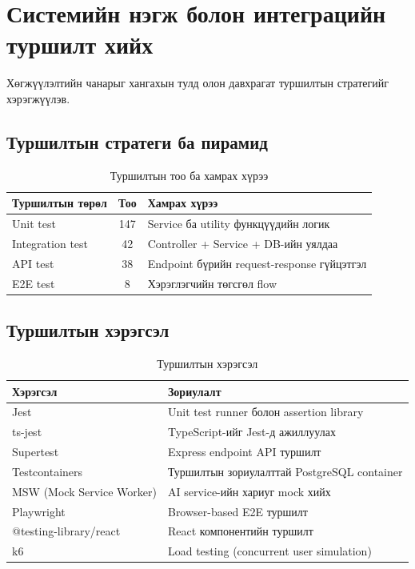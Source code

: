 \section{Системийн нэгж болон интеграцийн туршилт хийх}

Хөгжүүлэлтийн чанарыг хангахын тулд олон давхрагат туршилтын стратегийг хэрэгжүүлэв.

\subsection{Туршилтын стратеги ба пирамид}

\begin{table}[H]
\centering
\label{tab:test_pyramid}
\begin{tabular}{|l|c|p{5.5cm}|}
\hline
\textbf{Туршилтын төрөл} & \textbf{Тоо} & \textbf{Хамрах хүрээ} \\
\hline
Unit test & 147 & Service ба utility функцүүдийн логик \\
\hline
Integration test & 42 & Controller + Service + DB-ийн уялдаа \\
\hline
API test & 38 & Endpoint бүрийн request-response гүйцэтгэл \\
\hline
E2E test & 8 & Хэрэглэгчийн төгсгөл flow \\
\hline
\end{tabular}
\caption{Туршилтын тоо ба хамрах хүрээ}
\end{table}

\subsection{Туршилтын хэрэгсэл}

\begin{table}[H]
\centering
\label{tab:test_tools}
\begin{tabular}{|l|p{8.5cm}|}
\hline
\textbf{Хэрэгсэл} & \textbf{Зориулалт} \\
\hline
Jest & Unit test runner болон assertion library \\
\hline
ts-jest & TypeScript-ийг Jest-д ажиллуулах \\
\hline
Supertest & Express endpoint API туршилт \\
\hline
Testcontainers & Туршилтын зориулалттай PostgreSQL container \\
\hline
MSW (Mock Service Worker) & AI service-ийн хариуг mock хийх \\
\hline
Playwright & Browser-based E2E туршилт \\
\hline
@testing-library/react & React компонентийн туршилт \\
\hline
k6 & Load testing (concurrent user simulation) \\
\hline
\end{tabular}
\caption{Туршилтын хэрэгсэл}
\end{table}

